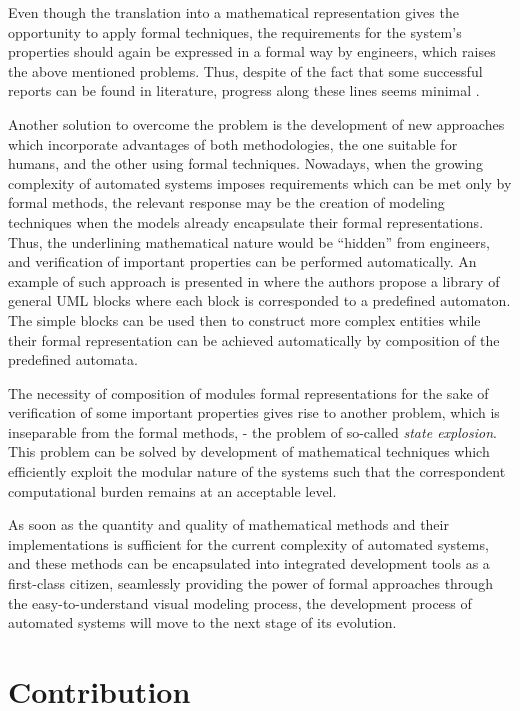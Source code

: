 Even though the translation into a mathematical representation gives the
opportunity to apply formal techniques, the requirements for the system's
properties should again be expressed in a formal way by engineers, which
raises the above mentioned problems. Thus, despite of the fact that some
successful reports can be found in literature, progress along these lines seems
minimal
. 

Another solution to overcome the problem is the development of new approaches
which incorporate advantages of both methodologies, the one suitable for humans,
and the other using formal techniques. Nowadays, when the growing complexity of
automated systems imposes requirements which can be met only by formal methods,
the relevant response may be the creation of modeling techniques when the models
already encapsulate their formal representations. Thus, the underlining
mathematical nature would be ``hidden'' from engineers, and verification of
important properties can be performed automatically. An example of such approach
is presented in \cite{sartini_architectures_2010} where the authors propose
a library of general UML blocks where each block is corresponded to a predefined
automaton. The simple blocks can be used then to construct more complex
entities while their formal representation can be achieved automatically by
composition of the predefined automata.

The necessity of composition of modules formal representations for the sake of
verification of some important properties gives rise to another problem, which
is inseparable from the formal methods, - the problem of so-called \emph{state
explosion}. This problem can be solved by development of mathematical
techniques which efficiently exploit the modular nature of the systems such
that the correspondent computational burden remains at an acceptable level.

As soon as the quantity and quality of mathematical methods and their
implementations is sufficient for the current complexity of automated systems,
and these methods can be encapsulated into integrated development tools as a
first-class citizen, seamlessly providing the power of formal approaches through
the easy-to-understand visual modeling process, the development process of
automated systems will move to the next stage of its evolution.

\section*{Contribution}

